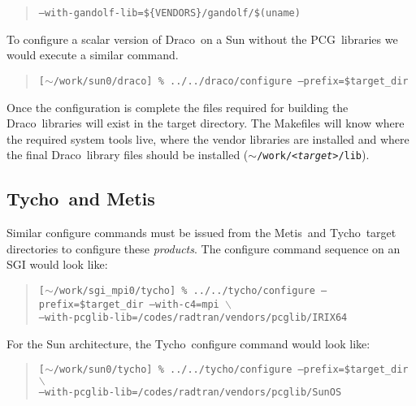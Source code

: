 \documentclass[10pt]{nmemo}
\newcommand{\comp}[1]{\normalfont\normalsize\texttt{#1}}
\newcommand{\draco}{{\normalfont\sffamily Draco}}
\newcommand{\tycho}{{\normalfont\sffamily Tycho}}
\newcommand{\metis}{{\normalfont\sffamily Metis}}
\newcommand{\pcg}{{\normalfont\sffamily PCG}}
\begin{document}
\footnotesize
\begin{verse}
\texttt{--with-gandolf-lib=\$\{VENDORS\}/gandolf/\$(uname)}
\end{verse}
\normalsize

To configure a scalar version of \draco\ on a Sun without the \pcg\ 
libraries we would execute a similar command.

\footnotesize
\begin{verse}
\texttt{[$\sim$/work/sun0/draco] \% ../../draco/configure --prefix=\${target\_dir} }\\
\end{verse}
\normalsize

Once the configuration is complete the files required for building the 
\draco\ libraries will exist in the target directory.  The Makefiles
will know where the required system tools live, where the vendor
libraries are installed and where the final \draco\ library files
should be installed (\comp{$\sim$/work/<\emph{target}>/lib}).

\subsection{\tycho\ and \metis}

Similar configure commands must be issued from the \metis\ and \tycho\ 
target directories to configure these \emph{products}.  The configure
command sequence on an SGI would look like:

\footnotesize
\begin{verse}
\texttt{[$\sim$/work/sgi\_mpi0/tycho] \% ../../tycho/configure
--prefix=\${target\_dir} --with-c4=mpi $\backslash$\\
\hspace{0.5in}--with-pcglib-lib=/codes/radtran/vendors/pcglib/IRIX64}
\end{verse}
\normalsize

For the Sun architecture, the \tycho\ configure command would look
like:

\footnotesize
\begin{verse}
\texttt{[$\sim$/work/sun0/tycho] \% ../../tycho/configure 
--prefix=\${target\_dir} $\backslash$\\
\hspace{0.5in}--with-pcglib-lib=/codes/radtran/vendors/pcglib/SunOS}
\end{verse}
\normalsize
\end{document}
